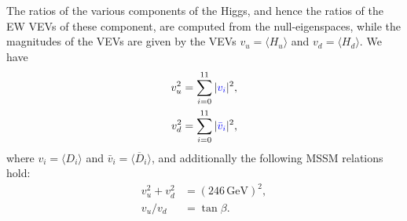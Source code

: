 \documentclass[a4paper,12pt]{article}
\def\BLUE{\textcolor{blue}}
\begin{document}
The ratios of the various components of the Higgs, and hence the ratios of the EW VEVs of these component, are computed from the null-eigenspaces, while the magnitudes of the VEVs are given by the VEVs $v_u=\langle H_u\rangle $ and $v_d=\langle H_d\rangle$. We have
\begin{align}
v_u^2&=\sum_{i=0}^{11} |\BLUE{v_i}|^2,\\
v_d^2&=\sum_{i=0}^{11} |\BLUE{\bar{v}_i}|^2,
\end{align}
where $v_i=\langle D_i\rangle$ and $\bar{v}_i=\langle \overline{D}_i\rangle$, and additionally the following MSSM relations hold:
\begin{align}
v_u^2+v_d^2&=(246\,\mathrm{GeV})^2,\\
v_u/v_d&=\tan\beta.
\end{align}

\end{document}
